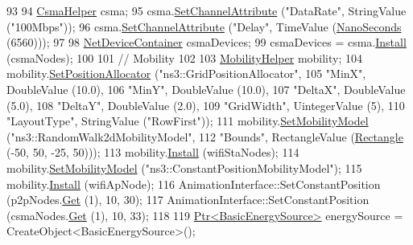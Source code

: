 \begin{DoxyCode}
93 
94   \hyperlink{classns3_1_1CsmaHelper}{CsmaHelper} csma;
95   csma.\hyperlink{classns3_1_1CsmaHelper_a886d900b2fe44433e0b81752dea7e7f1}{SetChannelAttribute} (\textcolor{stringliteral}{"DataRate"}, StringValue (\textcolor{stringliteral}{"100Mbps"}));
96   csma.\hyperlink{classns3_1_1CsmaHelper_a886d900b2fe44433e0b81752dea7e7f1}{SetChannelAttribute} (\textcolor{stringliteral}{"Delay"}, TimeValue (\hyperlink{group__timecivil_ga281d64bcb4dad96267d83c7688ec433f}{NanoSeconds} (6560)));
97 
98   \hyperlink{classns3_1_1NetDeviceContainer}{NetDeviceContainer} csmaDevices;
99   csmaDevices = csma.\hyperlink{classns3_1_1CsmaHelper_af79a91372595230b0817200270ab84e7}{Install} (csmaNodes);
100 
101   \textcolor{comment}{// Mobility}
102 
103   \hyperlink{classns3_1_1MobilityHelper}{MobilityHelper} mobility;
104   mobility.\hyperlink{classns3_1_1MobilityHelper_ac59d5295076be3cc11021566713a28c5}{SetPositionAllocator} (\textcolor{stringliteral}{"ns3::GridPositionAllocator"},
105                                  \textcolor{stringliteral}{"MinX"}, DoubleValue (10.0),
106                                  \textcolor{stringliteral}{"MinY"}, DoubleValue (10.0),
107                                  \textcolor{stringliteral}{"DeltaX"}, DoubleValue (5.0),
108                                  \textcolor{stringliteral}{"DeltaY"}, DoubleValue (2.0),
109                                  \textcolor{stringliteral}{"GridWidth"}, UintegerValue (5),
110                                  \textcolor{stringliteral}{"LayoutType"}, StringValue (\textcolor{stringliteral}{"RowFirst"}));
111   mobility.\hyperlink{classns3_1_1MobilityHelper_a030275011b6f40682e70534d30280aba}{SetMobilityModel} (\textcolor{stringliteral}{"ns3::RandomWalk2dMobilityModel"},
112                              \textcolor{stringliteral}{"Bounds"}, RectangleValue (\hyperlink{classns3_1_1Rectangle}{Rectangle} (-50, 50, -25, 50)));
113   mobility.\hyperlink{classns3_1_1MobilityHelper_a07737960ee95c0777109cf2994dd97ae}{Install} (wifiStaNodes);
114   mobility.\hyperlink{classns3_1_1MobilityHelper_a030275011b6f40682e70534d30280aba}{SetMobilityModel} (\textcolor{stringliteral}{"ns3::ConstantPositionMobilityModel"});
115   mobility.\hyperlink{classns3_1_1MobilityHelper_a07737960ee95c0777109cf2994dd97ae}{Install} (wifiApNode);
116   AnimationInterface::SetConstantPosition (p2pNodes.\hyperlink{classns3_1_1NodeContainer_a9ed96e2ecc22e0f5a3d4842eb9bf90bf}{Get} (1), 10, 30); 
117   AnimationInterface::SetConstantPosition (csmaNodes.\hyperlink{classns3_1_1NodeContainer_a9ed96e2ecc22e0f5a3d4842eb9bf90bf}{Get} (1), 10, 33); 
118 
119   \hyperlink{classns3_1_1Ptr}{Ptr<BasicEnergySource>} energySource = CreateObject<BasicEnergySource>();

\end{DoxyCode}
